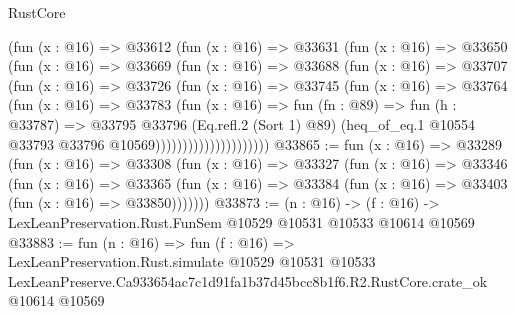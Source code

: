 \begin{lexlean}{RustCore}
\begin{coremodule}
                      (fun (x : @16) =>
                      @33612
                        (fun (x : @16) =>
                        @33631
                          (fun (x : @16) =>
                          @33650
                            (fun (x : @16) =>
                            @33669
                              (fun (x : @16) =>
                              @33688
                                (fun (x : @16) =>
                                @33707
                                  (fun (x : @16) =>
                                  @33726
                                    (fun (x : @16) =>
                                    @33745
                                      (fun (x : @16) =>
                                      @33764
                                        (fun (x : @16) =>
                                        @33783
                                          (fun (x : @16) =>
                                          fun (fn : @89) =>
                                          fun (h : @33787) =>
                                          @33795
                                            @33796
                                            (Eq.refl.{2} (Sort 1) @89)
                                            (heq_of_eq.{1}
                                              @10554
                                              @33793
                                              @33796
                                              @10569)))))))))))))))))))))
@33865 := fun (x : @16) =>
  @33289
    (fun (x : @16) =>
    @33308
      (fun (x : @16) =>
      @33327
        (fun (x : @16) =>
        @33346
          (fun (x : @16) =>
          @33365 (fun (x : @16) => @33384 (fun (x : @16) => @33403 (fun (x : @16) => @33850)))))))
@33873 := (n : @16) ->
  (f : @16) -> LexLeanPreservation.Rust.FunSem @10529 @10531 @10533 @10614 @10569
@33883 := fun (n : @16) =>
  fun (f : @16) =>
  LexLeanPreservation.Rust.simulate
    @10529
    @10531
    @10533
    LexLeanPreserve.Ca933654ac7c1d91fa1b37d45bcc8b1f6.R2.RustCore.crate_ok
    @10614
    @10569
\end{coremodule}
\end{lexlean}
